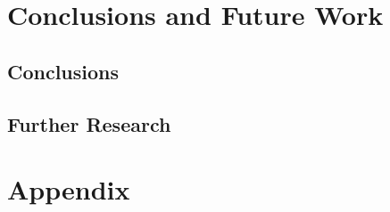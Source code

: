 \documentclass[11pt, a4paper, english]{book}
\begin{document}

\chapter{Conclusions and Future Work}

\section{Conclusions}



\section{Further Research}


\listoffigures
\listoftables

\newpage



\appendix
\chapter{Appendix}

\end{document}
